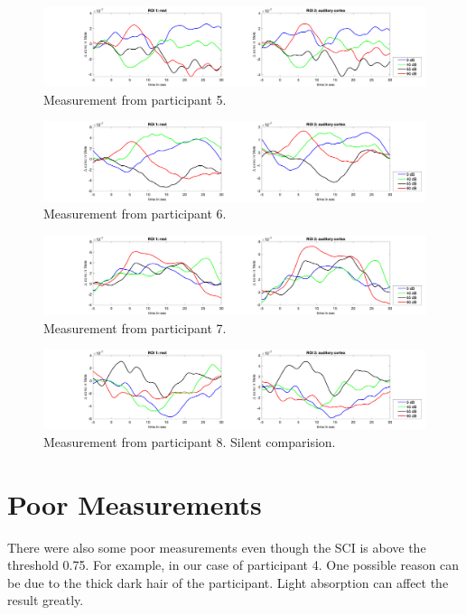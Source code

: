 \begin{figure}[H]
  \centering
    \includegraphics[scale=.29]{bilder/ROI/sub_lukas_s_HbO.png}
  \caption{Measurement from participant 5.}
\end{figure}

\begin{figure}[H]
  \centering
    \includegraphics[scale=.29]{bilder/ROI/sub_shelia_s_HbO.png}
  \caption{Measurement from participant  6.}
\end{figure}


\begin{figure}[H]
  \centering
    \includegraphics[scale=.29]{bilder/ROI/sub_liao_s_HbO.png}
  \caption{Measurement from participant 7.}
\end{figure}



\begin{figure}[H]
  \centering
    \includegraphics[scale=.29]{bilder/ROI/sub_luca2_s_HbO.png}
  \caption{Measurement from participant 8. Silent comparision.}
\end{figure}

\newpage

\section {Poor Measurements}
There were also some poor measurements even though the SCI is above the threshold 0.75. For example, in our case of participant 4. One possible reason can be due to the thick dark hair of the participant. Light absorption can affect the result greatly.

